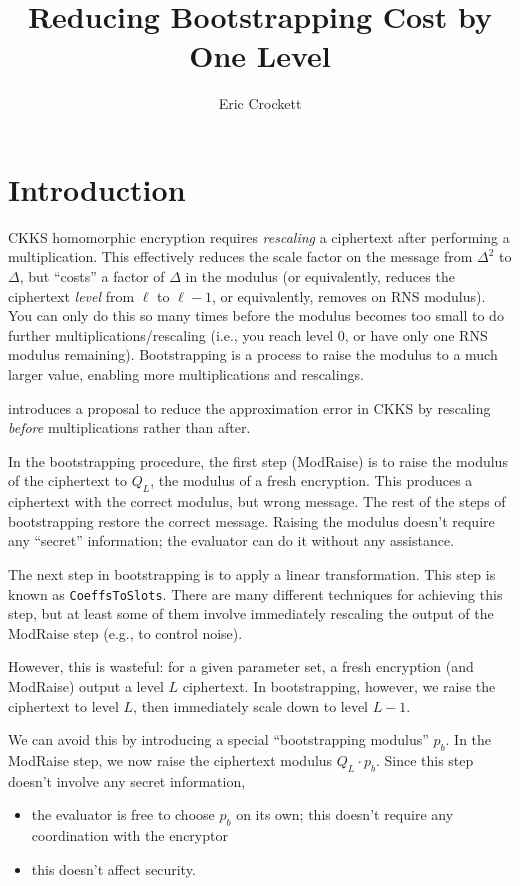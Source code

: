 \documentclass{article}
\begin{document}
	\title{Reducing Bootstrapping Cost by One Level}
	\author{Eric Crockett}
	\maketitle
	
	\listoffixmes
	
	\section{Introduction}
	CKKS homomorphic encryption requires \emph{rescaling} a ciphertext after performing a multiplication. This effectively reduces the scale factor on the message from $\Delta^2$ to $\Delta$, but ``costs'' a factor of $\Delta$ in the modulus (or equivalently, reduces the ciphertext \emph{level} from $\ell$ to $\ell-1$, or equivalently, removes on RNS modulus). You can only do this so many times before the modulus becomes too small to do further multiplications/rescaling (i.e., you reach level 0, or have only one RNS modulus remaining). Bootstrapping is a process to raise the modulus to a much larger value, enabling more multiplications and rescalings.
	
	\cite{cryptoeprint:2020/1118} introduces a proposal to reduce the approximation error in CKKS by rescaling \emph{before} multiplications rather than after.
	
	In the bootstrapping procedure, the first step (ModRaise) is to raise the modulus of the ciphertext to $Q_L$, the modulus of a fresh encryption. This produces a ciphertext with the correct modulus, but wrong message. The rest of the steps of bootstrapping restore the correct message. Raising the modulus doesn't require any ``secret'' information; the evaluator can do it without any assistance.
	
	The next step in bootstrapping is to apply a linear transformation. This step is known as \texttt{CoeffsToSlots}. There are many different techniques for achieving this step, but at least some of them involve immediately rescaling the output of the ModRaise step (e.g., to control noise).
	
	However, this is wasteful: for a given parameter set, a fresh encryption (and ModRaise) output a level $L$ ciphertext. In bootstrapping, however, we raise the ciphertext to level $L$, then immediately scale down to level $L-1$.
	
	We can avoid this by introducing a special ``bootstrapping modulus'' $p_b$. In the ModRaise step, we now raise the ciphertext modulus $Q_L\cdot p_b$. Since this step doesn't involve any secret information,
	\begin{itemize}
		\item the evaluator is free to choose $p_b$ on its own; this doesn't require any coordination with the encryptor
		\item this doesn't affect security.
	\end{itemize}
	
\end{document}
